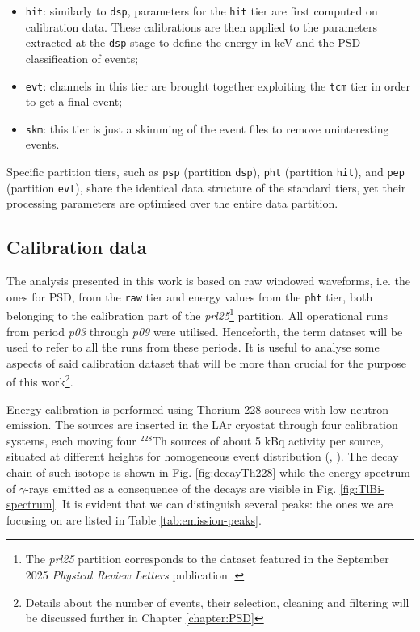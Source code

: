\begin{itemize}
    \item \texttt{hit}: similarly to \texttt{dsp}, parameters for the \texttt{hit} tier are first computed on calibration data. These calibrations are then applied to the parameters extracted at the \texttt{dsp} stage to define the energy in keV and the PSD classification of events;
    \item \texttt{evt}: channels in this tier are brought together exploiting the \texttt{tcm} tier in order to get a final event;
    \item \texttt{skm}: this tier is just a skimming of the event files to remove uninteresting events.
\end{itemize} 
Specific partition tiers, such as \texttt{psp} (partition \texttt{dsp}), \texttt{pht} (partition \texttt{hit}), and \texttt{pep} (partition \texttt{evt}), share the identical data structure of the standard tiers, yet their processing parameters are optimised over the entire data partition.


\subsection{Calibration data}
The analysis presented in this work is based on raw windowed waveforms, i.e. the ones for \ac{PSD}, from the \texttt{raw} tier and energy values from the \texttt{pht} tier, both belonging to the calibration part of the \textit{prl25}\footnote{The \textit{prl25} partition corresponds to the dataset featured in the September 2025 \textit{Physical Review Letters} publication \cite{L200-sep25}.} partition. All operational runs from period \textit{p03} through \textit{p09} were utilised. Henceforth, the term dataset will be used to refer to all the runs from these periods.
It is useful to analyse some aspects of said calibration dataset that will be more than crucial for the purpose of this work\footnote{Details about the number of events, their selection, cleaning and filtering will be discussed further in Chapter \ref{chapter:PSD}}.

Energy calibration is performed using Thorium-228 sources with low neutron emission. The sources are inserted in the LAr cryostat through four calibration systems, each moving four ${}^{228}$Th sources of about 5 kBq activity per source, situated at different heights for homogeneous event distribution (\cite{L200:calibration}, \cite{LEGEND:GeDet}). The decay chain of such isotope is shown in Fig. \ref{fig:decayTh228} while the energy spectrum of $\gamma$-rays emitted as a consequence of the decays are visible in Fig. \ref{fig:TlBi-spectrum}. It is evident that we can distinguish several peaks: the ones we are focusing on are listed in Table \ref{tab:emission-peaks}.

